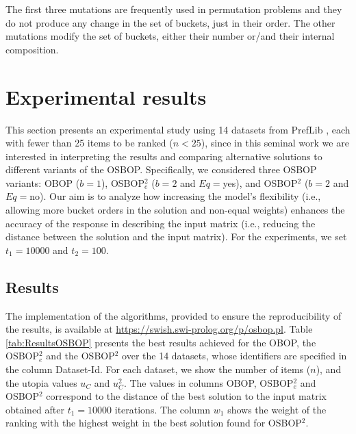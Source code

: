 \documentclass[preprint,12pt]{article}
\theoremstyle{definition}
\theoremstyle{remark}
\theoremstyle{example} %
\begin{document}
The first three mutations are frequently used in permutation problems \cite{Ceberio:TEC:2014,Talbi2009} and they do not produce any change in the set of buckets, just in their order. 
The other mutations modify the set of buckets, either their number or/and their internal composition.



\section{Experimental results}\label{sec:experiments}


This section presents an experimental study using 14 datasets from PrefLib \cite{Mattei2013}, each with fewer than 25 items to be ranked ($n<25$), since in this seminal work we are interested in interpreting the results and comparing alternative solutions to different variants of the OSBOP. 
Specifically, we considered three  OSBOP variants: OBOP ($b=1$), OSBOP$^2_e$ ($b=2$ and $Eq=$yes), and OSBOP$^2$ ($b=2$ and $Eq=$no).
Our aim is to analyze how increasing the model's flexibility (i.e., allowing more bucket orders in the solution and non-equal weights) enhances the accuracy of the response in describing the input matrix (i.e., reducing the distance between the solution and the input matrix). For the experiments, we set $t_1=10000$ and $t_2=100$.




\subsection{Results}

 The implementation of the algorithms, provided to ensure the reproducibility of the results, is available at \url{https://swish.swi-prolog.org/p/osbop.pl}. Table \ref{tab:ResultsOSBOP} presents the best results achieved for the OBOP, the  OSBOP$^2_e$  and the OSBOP$^2$ over the 14 datasets, whose identifiers are specified in the column Dataset-Id. For each dataset, we show  the number of items ($n$), and the utopia values $u_C$ and $u_C^2$. The values in columns OBOP, OSBOP$^2_e$ and OSBOP$^2$ correspond to the distance of the best solution to the input matrix obtained after $t_1=10000$ iterations. The column $w_1$ shows the weight of the ranking with the highest weight in the best solution found for OSBOP$^2$. 
\end{document}
